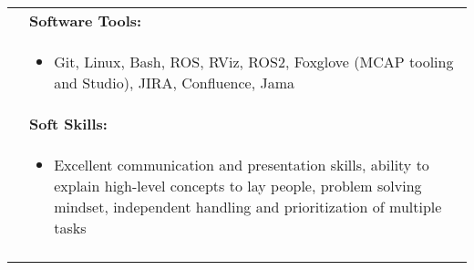 \begin{tabular}{L{\hlcolw}  L{\rcolw}}
	& \textbf{Software Tools:} \\
	&
	\vspace{-0.25in}
	\begin{itemize}[leftmargin = \itemmargin]
		\item Git, Linux, Bash, ROS, RViz, ROS2, Foxglove (MCAP tooling and Studio), JIRA, Confluence, Jama
	\end{itemize}
	\\

	& \textbf{Soft Skills:} \\
	&
	\vspace{-0.25in}
	\begin{itemize}[leftmargin = \itemmargin]
		\item Excellent communication and presentation skills, ability to explain high-level concepts to lay people, problem solving mindset, independent handling and prioritization of multiple tasks 
	\end{itemize}
	\\

	\hline \\
\end{tabular}